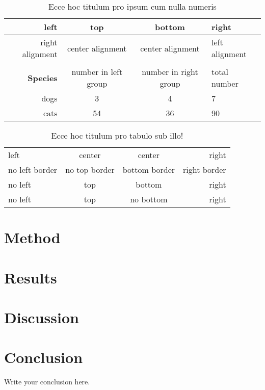 \documentclass{article}
\begin{document}
\begin{table}[h!]
\begin{tabular}{| r | c | c | l |}
\hline
 left & top & bottom & right \\
\hline
right alignment & center alignment & center alignment & left alignment \\
\hline
&&&\\
\hline
\textbf{Species} & number in left group & number in right group & total number \\
\hline
dogs & 3 & 4 & 7 \\
\hline
cats & 54 & 36 & 90 \\
\hline

\end{tabular}
\caption*{Ecce hoc titulum pro ipsum cum nulla numeris}
\end{table}


\begin{table}[h!]				%
\centering
\begin{tabular}{ l | c | c | r | }
left & center & center & right \\
no left border & no top border & bottom border & right border \\ 
\hline 
no left & top & bottom & right \\
\hline
no left & top & no bottom & right \\
\end{tabular}
\caption{Ecce hoc titulum pro tabulo sub illo!}
\end{table}

\pagebreak

\section{Method}

\section{Results}

\section{Discussion}

\section{Conclusion}
Write your conclusion here.
\end{document}
